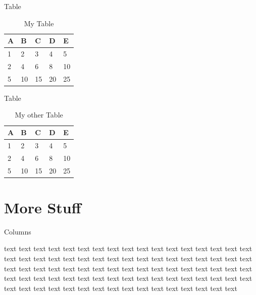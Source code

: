 \begin{frame}[t]{Table}\vspace{5pt}
\begin{table}[]
\begin{tabular}{|lllll|}
\hline
A & B  & C  & D  & E  \\ \hline
1 & 2  & 3  & 4  & 5  \\
2 & 4  & 6  & 8  & 10 \\
5 & 10 & 15 & 20 & 25 \\ \hline
\end{tabular}
\caption{My Table}
\end{table}
\end{frame}

\begin{frame}{Table}\vspace{5pt}
\begin{table}[]
\begin{tabular}{|lllll|}
\hline
A & B  & C  & D  & E  \\ \hline
1 & 2  & 3  & 4  & 5  \\
2 & 4  & 6  & 8  & 10 \\
5 & 10 & 15 & 20 & 25 \\ \hline
\end{tabular}
\caption{My other Table}
\end{table}
\end{frame}

\section{More Stuff}

\begin{frame}[t]{Columns}\vspace{5pt}
\begin{multicols}{2}
text text text text text text text text text text text text text text text text text text text text text text text text text text \textcolor{RedOrange}{text} text text text \columnbreak text text text text text text text text text text text text text text text text text text text text text text text text text text text text text text text text \colorbox{Dandelion}{text} text text text text text text text text text text text text text text text text text text text text text  
\end{multicols}
\end{frame}

